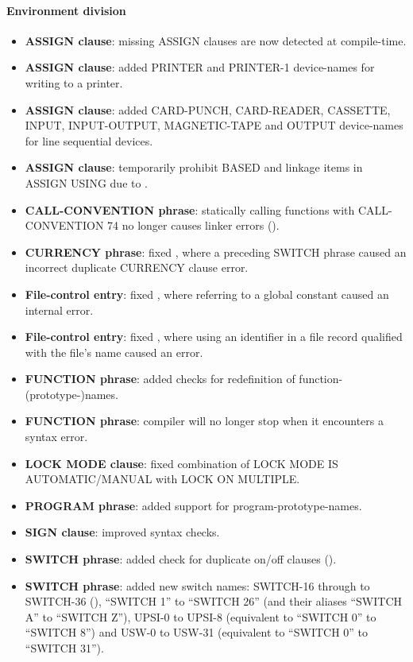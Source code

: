 \paragraph{Environment division}
\begin{itemize}
\item \textbf{ASSIGN clause}: missing ASSIGN clauses are now detected at compile-time.
\item \textbf{ASSIGN clause}: added PRINTER and PRINTER-1 device-names for writing to a printer.
\item \textbf{ASSIGN clause}: added CARD-PUNCH, CARD-READER, CASSETTE, INPUT, INPUT-OUTPUT, MAGNETIC-TAPE and OUTPUT device-names for line sequential devices.
\item \textbf{ASSIGN clause}: temporarily prohibit BASED and linkage items in ASSIGN USING due to .
\item \textbf{CALL-CONVENTION phrase}: statically calling functions with CALL-CONVENTION 74 no longer causes linker errors ().
\item \textbf{CURRENCY phrase}: fixed , where a preceding SWITCH phrase caused an incorrect duplicate CURRENCY clause error.
\item \textbf{File-control entry}: fixed , where referring to a global constant caused an internal error.
\item \textbf{File-control entry}: fixed , where using an identifier in a file record qualified with the file's name caused an error.
\item \textbf{FUNCTION phrase}: added checks for redefinition of function-(prototype-)names.
\item \textbf{FUNCTION phrase}: compiler will no longer stop when it encounters a syntax error.
\item \textbf{LOCK MODE clause}: fixed combination of LOCK MODE IS AUTOMATIC/MANUAL with LOCK ON MULTIPLE.
\item \textbf{PROGRAM phrase}: added support for program-prototype-names.
\item \textbf{SIGN clause}: improved syntax checks.
\item \textbf{SWITCH phrase}: added check for duplicate on\slash{}off clauses ().
\item \textbf{SWITCH phrase}: added new switch names: SWITCH-16 through to SWITCH-36 (), ``SWITCH 1'' to ``SWITCH 26'' (and their aliases  ``SWITCH A'' to ``SWITCH Z''), UPSI-0 to UPSI-8 (equivalent to ``SWITCH 0'' to ``SWITCH 8'') and USW-0 to USW-31 (equivalent to ``SWITCH 0'' to ``SWITCH 31'').
\end{itemize}

